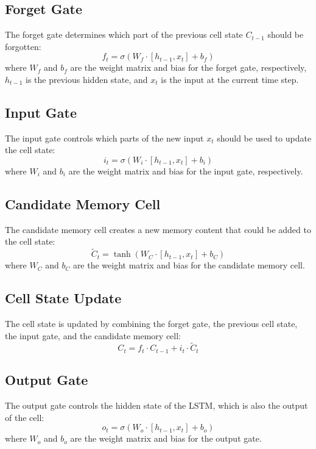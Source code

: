 \documentclass{article}
\begin{document}
\subsection{Forget Gate}
The forget gate determines which part of the previous cell state \(C_{t-1}\) should be forgotten:
\begin{equation}
    f_t = \sigma(W_f \cdot [h_{t-1}, x_t] + b_f)
\end{equation}
where \(W_f\) and \(b_f\) are the weight matrix and bias for the forget gate, respectively, \(h_{t-1}\) is the previous hidden state, and \(x_t\) is the input at the current time step.

\subsection{Input Gate}
The input gate controls which parts of the new input \(x_t\) should be used to update the cell state:
\begin{equation}
    i_t = \sigma(W_i \cdot [h_{t-1}, x_t] + b_i)
\end{equation}
where \(W_i\) and \(b_i\) are the weight matrix and bias for the input gate, respectively.

\subsection{Candidate Memory Cell}
The candidate memory cell creates a new memory content that could be added to the cell state:
\begin{equation}
    \tilde{C}_t = \tanh(W_C \cdot [h_{t-1}, x_t] + b_C)
\end{equation}
where \(W_C\) and \(b_C\) are the weight matrix and bias for the candidate memory cell.

\subsection{Cell State Update}
The cell state is updated by combining the forget gate, the previous cell state, the input gate, and the candidate memory cell:
\begin{equation}
    C_t = f_t \cdot C_{t-1} + i_t \cdot \tilde{C}_t
\end{equation}

\subsection{Output Gate}
The output gate controls the hidden state of the LSTM, which is also the output of the cell:
\begin{equation}
    o_t = \sigma(W_o \cdot [h_{t-1}, x_t] + b_o)
\end{equation}
where \(W_o\) and \(b_o\) are the weight matrix and bias for the output gate.
\end{document}
